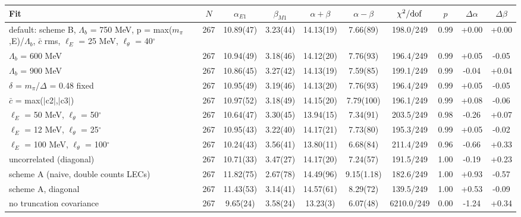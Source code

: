 \begin{tabular}{lccccccccc}
\hline
Fit & $N$ & $\alpha_{E1}$ & $\beta_{M1}$ & $\alpha+\beta$ & $\alpha-\beta$ & $\chi^2/{\rm dof}$ & $p$ & $\Delta\alpha$ & $\Delta\beta$ \\
\hline
default: scheme B, $\Lambda_b$ = 750 MeV, p = max($m_\pi$,E)/$\Lambda_b$, $\bar c$ rms, $\ell_E$ = 25 MeV, $\ell_\theta$ = 40$^\circ$ & 267 & 10.89(47) & 3.23(44) & 14.13(19) & 7.66(89) & 198.0/249 & 0.99 & +0.00 & +0.00 \\
$\Lambda_b$ = 600 MeV & 267 & 10.94(49) & 3.18(46) & 14.12(20) & 7.76(93) & 196.4/249 & 0.99 & +0.05 & -0.05 \\
$\Lambda_b$ = 900 MeV & 267 & 10.86(45) & 3.27(42) & 14.13(19) & 7.59(85) & 199.1/249 & 0.99 & -0.04 & +0.04 \\
$\delta$ = $m_\pi$/$\Delta$ = 0.48 fixed & 267 & 10.95(49) & 3.19(46) & 14.13(20) & 7.76(93) & 196.4/249 & 0.99 & +0.05 & -0.05 \\
$\bar c$ = max($|$c2$|$,$|$c3$|$) & 267 & 10.97(52) & 3.18(49) & 14.15(20) & 7.79(100) & 196.1/249 & 0.99 & +0.08 & -0.06 \\
$\ell_E$ = 50 MeV, $\ell_\theta$ = 50$^\circ$ & 267 & 10.64(47) & 3.30(45) & 13.94(15) & 7.34(91) & 203.5/249 & 0.98 & -0.26 & +0.07 \\
$\ell_E$ = 12 MeV, $\ell_\theta$ = 25$^\circ$ & 267 & 10.95(43) & 3.22(40) & 14.17(21) & 7.73(80) & 195.3/249 & 0.99 & +0.05 & -0.02 \\
$\ell_E$ = 100 MeV, $\ell_\theta$ = 100$^\circ$ & 267 & 10.24(43) & 3.56(41) & 13.80(11) & 6.68(84) & 211.4/249 & 0.96 & -0.66 & +0.33 \\
uncorrelated (diagonal) & 267 & 10.71(33) & 3.47(27) & 14.17(20) & 7.24(57) & 191.5/249 & 1.00 & -0.19 & +0.23 \\
scheme A (naive, double counts LECs) & 267 & 11.82(75) & 2.67(78) & 14.49(96) & 9.15(1.18) & 182.6/249 & 1.00 & +0.93 & -0.57 \\
scheme A, diagonal & 267 & 11.43(53) & 3.14(41) & 14.57(61) & 8.29(72) & 139.5/249 & 1.00 & +0.53 & -0.09 \\
no truncation covariance & 267 & 9.65(24) & 3.58(24) & 13.23(3) & 6.07(48) & 6210.0/249 & 0.00 & -1.24 & +0.34 \\
\hline
\end{tabular}

